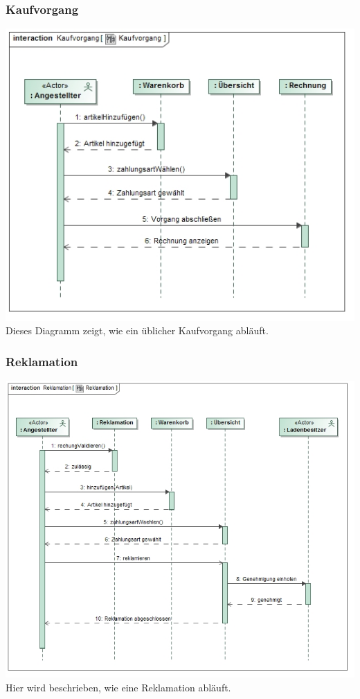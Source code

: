 \documentclass[pdftex,12pt,a4paper]{article}
\begin{document}
\subsubsection*{Kaufvorgang}
\includegraphics[width=1\textwidth]{../Pflichtenheft/images/kaufvorgang}
Dieses Diagramm zeigt, wie ein \"ublicher Kaufvorgang abl\"auft.
\subsubsection*{Reklamation}
\includegraphics[width=1\textwidth]{../Pflichtenheft/images/reklamation}
Hier wird beschrieben, wie eine Reklamation abl\"auft.
\end{document}
